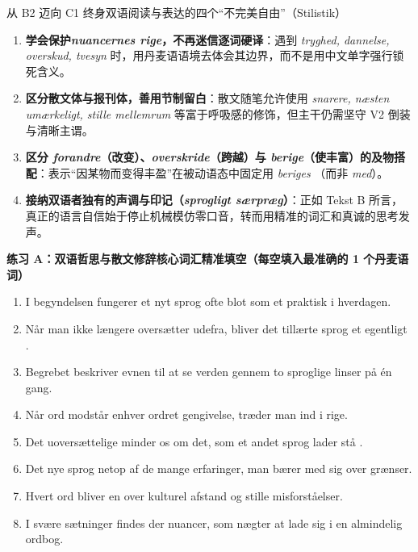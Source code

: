 \begin{grammatikbox}{从 B2 迈向 C1 终身双语阅读与表达的四个“不完美自由”（Stilistik）}
\begin{enumerate}
  \item \textbf{ 学会保护\textit{nuancernes rige}，不再迷信逐词硬译}：遇到 \textit{tryghed, dannelse, overskud, tvesyn} 时，用丹麦语语境去体会其边界，而不是用中文单字强行锁死含义。
  \item \textbf{ 区分散文体与报刊体，善用节制留白}：散文随笔允许使用 \textit{snarere, næsten umærkeligt, stille mellemrum} 等富于呼吸感的修饰，但主干仍需坚守 V2 倒装与清晰主谓。
  \item \textbf{ 区分 \textit{forandre}（改变）、\textit{overskride}（跨越）与 \textit{berige}（使丰富）的及物搭配}：表示“因某物而变得丰盈”在被动语态中固定用 \textit{beriges }（而非 \textit{med}）。
  \item \textbf{ 接纳双语者独有的声调与印记（\textit{sprogligt særpræg}）}：正如 Tekst B 所言，真正的语言自信始于停止机械模仿零口音，转而用精准的词汇和真诚的思考发声。
\end{enumerate}
\end{grammatikbox}


\textbf{练习 A：双语哲思与散文修辞核心词汇精准填空（每空填入最准确的 1 个丹麦语词）}
\begin{enumerate}
  \item I begyndelsen fungerer et nyt sprog ofte blot som et praktisk \underline{\hspace{2.2cm}} i hverdagen.
  \item Når man ikke længere oversætter udefra, bliver det tillærte sprog et egentligt \underline{\hspace{2.2cm}}.
  \item Begrebet \underline{\hspace{2.2cm}} beskriver evnen til at se verden gennem to sproglige linser på én gang.
  \item Når ord modstår enhver ordret gengivelse, træder man ind i \underline{\hspace{2.2cm}} rige.
  \item Det uoversættelige minder os om det, som et andet sprog lader stå \underline{\hspace{2.2cm}}.
  \item Det nye sprog \underline{\hspace{2.2cm}} netop af de mange erfaringer, man bærer med sig over grænser.
  \item Hvert ord bliver en \underline{\hspace{2.2cm}} over kulturel afstand og stille misforståelser.
  \item I svære sætninger findes der nuancer, som nægter at lade sig \underline{\hspace{2.2cm}} i en almindelig ordbog.
\end{enumerate}

